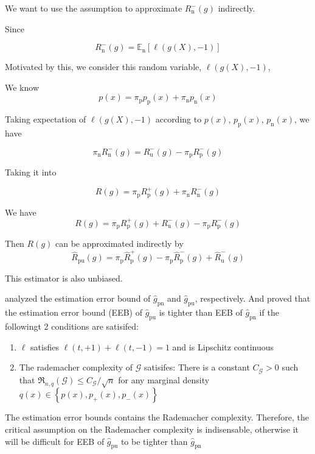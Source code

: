 \documentclass[12pt]{article}
\theoremstyle{definition}
\begin{document}
We want to use the assumption to approximate $R_{\mathrm{n}}^{-}(g)$ indirectly.

Since 

$$
R_{\mathrm{n}}^{-}(g)=\mathbb{E}_{\mathrm{n}}[\ell(g(X),-1)]
$$

Motivated by this, we consider this random variable, $\ell(g(X),-1)$, 

We know
$$p(x) = \pi_\mathrm{p}p_\mathrm{p}(x) + \pi_\mathrm{n}p_\mathrm{n}(x)$$

Taking expectation of $\ell(g(X),-1)$ according to $p(x)$, $p_{\mathrm{p}}(x)$, $p_{\mathrm{n}}(x)$, we have 

$$
\pi_{\mathrm{n}} R_{\mathrm{n}}^{-}(g)=R_{\mathrm{u}}^{-}(g)-\pi_{\mathrm{p}} R_{\mathrm{p}}^{-}(g)
$$

Taking it into 

$$
R(g)=\pi_{\mathrm{p}} R_{\mathrm{p}}^{+}(g)+\pi_{\mathrm{n}} R_{\mathrm{n}}^{-}(g)
$$

We have
$$
R(g)=\pi_{\mathrm{p}} R_{\mathrm{p}}^{+}(g)+R_{\mathrm{u}}^{-}(g)-\pi_{\mathrm{p}} R_{\mathrm{p}}^{-}(g)
$$

Then $R(g)$ can be approximated indirectly by 
\begin{equation}
	\widehat{R}_{\mathrm{pu}}(g)=\pi_{\mathrm{p}} \widehat{R}_{\mathrm{p}}^{+}(g)-\pi_{\mathrm{p}} \widehat{R}_{\mathrm{p}}^{-}(g)+\widehat{R}_{\mathrm{u}}^{-}(g)
\end{equation}

This estimator is also unbiased. 

\cite{niu2016theoretical} analyzed the estimation error bound of $\widehat{g}_\mathrm{pn}$ and $\widehat{g}_\mathrm{pu}$, respectively. And \cite{niu2016theoretical} proved that the estimation error bound (EEB) of $\widehat{g}_\mathrm{pu}$ is tighter than EEB of $\widehat{g}_\mathrm{pn}$ if the followingt  2 conditions are satisifed:

\begin{enumerate}
	\item $\ell$ satisfies $\ell(t,+1)+\ell(t,-1)  = 1$ and is Lipschitz continuous
	\item The rademacher complexity of $\mathcal{G}$ satisifes: There is a constant $C_{\mathcal{G}}>0$ such that $\mathfrak{R}_{n, q}(\mathcal{G}) \leq C_{\mathcal{G}} / \sqrt{n}$ for any marginal density $q(x)\in \left\{p(x), p_{+}(x), p_{-}(x)\right\}$
\end{enumerate}

The estimation error bounds contains the Rademacher complexity. Therefore, the critical assumption on the Rademacher complexity is indisensable, otherwise it will be difficult for EEB of $\widehat{g}_\mathrm{pu}$  to be tighter than $\widehat{g}_\mathrm{pn}$ 
\end{document}
